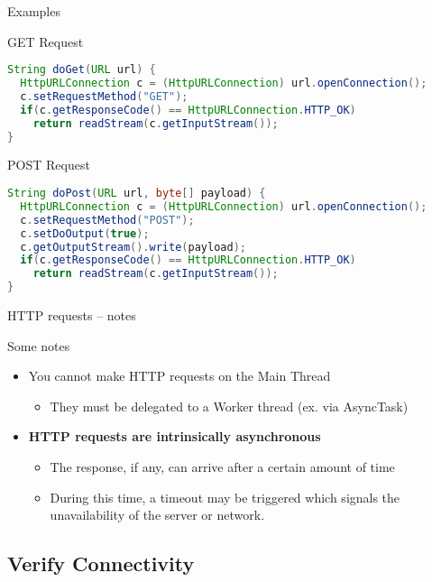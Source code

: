\documentclass{beamer}
\begin{document}
  \begin{frame}[fragile]{Examples}
    \begin{exampleblock}{GET Request}
      \begin{lstlisting}[language=Java]
String doGet(URL url) {
  HttpURLConnection c = (HttpURLConnection) url.openConnection();
  c.setRequestMethod("GET");
  if(c.getResponseCode() == HttpURLConnection.HTTP_OK)
    return readStream(c.getInputStream());
}
      \end{lstlisting}
    \end{exampleblock}

    \begin{exampleblock}{POST Request}
      \begin{lstlisting}[language=Java]
String doPost(URL url, byte[] payload) {
  HttpURLConnection c = (HttpURLConnection) url.openConnection();
  c.setRequestMethod("POST");
  c.setDoOutput(true);
  c.getOutputStream().write(payload);
  if(c.getResponseCode() == HttpURLConnection.HTTP_OK)
    return readStream(c.getInputStream());
}
      \end{lstlisting}
    \end{exampleblock}
  \end{frame}

  \begin{frame}{HTTP requests -- notes}
    \begin{block}{Some notes}
      \begin{itemize}\itemsep20pt
        \item You cannot make HTTP requests on the Main Thread 
        \begin{itemize}
          \item They must be delegated to a Worker thread (ex. via AsyncTask)
        \end{itemize}
        \item \textbf{HTTP requests are intrinsically asynchronous} 
      \begin{itemize}
        \item The response, if any, can arrive after a certain amount of time
        \item During this time, a timeout may be triggered which signals the
        unavailability of the server or network.
      \end{itemize}
      \end{itemize}
    \end{block}
  \end{frame}

\subsection{Verify Connectivity}
\end{document}
